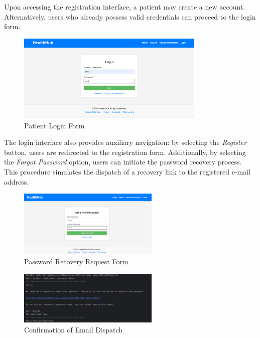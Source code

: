 Upon accessing the registration interface, a patient may create a new account. Alternatively, users who already possess valid credentials can proceed to the login form.

\begin{figure}[H]
	\centering
	\includegraphics[width=0.8\textwidth]{resources/login-patient.png}
	\caption{Patient Login Form}
	\label{fig:login-patient}
\end{figure}

The login interface also provides auxiliary navigation: by selecting the \textit{Register} button, users are redirected to the registration form. Additionally, by selecting the \textit{Forgot Password} option, users can initiate the password recovery process. This procedure simulates the dispatch of a recovery link to the registered e-mail address.

\begin{figure}[H]
	\centering
	\includegraphics[width=0.6\textwidth]{resources/recover1.png}
	\caption{Password Recovery Request Form}
	\label{fig:recover1}
\end{figure}

\begin{figure}[H]
	\centering
	\includegraphics[width=0.6\textwidth]{resources/recover2.png}
	\caption{Confirmation of Email Dispatch}
	\label{fig:recover2}
\end{figure}

